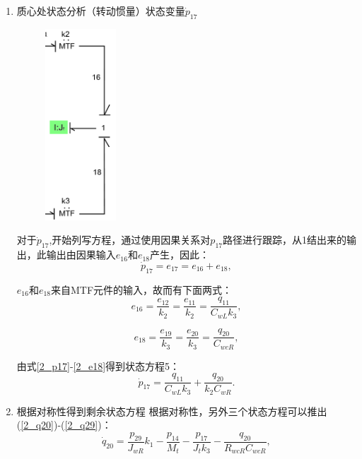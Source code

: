 \begin{enumerate}
\item {质心处状态分析（转动惯量）状态变量$\dot{ p}_{17}$}
\begin{figure}[h]
	\centering
	\includegraphics[width=0.25\textwidth]{fig/2_equation5.png}
\end{figure}
对于$\dot{p} _ { 17 }$,开始列写方程，通过使用因果关系对$p_{17}$路径进行跟踪，从1结出来的输出，此输出由因果输入$e _ { 16 }$和$  e _ { 18 }$产生，因此：
\begin{equation}\label{2_p17}
\dot{p}_{17}
=
e_{17}
=
e_{16}
+
e_{18},
\end{equation}

$e _ { 16 }$和$e_{18}$来自MTF元件的输入，故而有下面两式：
\begin{equation}\label{2_e16}
e_{16}
=
\frac{e_{12}}{k_2}
=
\frac{e_{11}}{k_2}
=
\frac{q_{11}}{C_{w L} k_{3}},
\end{equation}

\begin{equation}\label{2_e18}
e_{18}
=
\frac{e_{19}}{k_3}
=
\frac{e_{20}}{k_3}
=
\frac{q_{20}}{C_{wc R}},
\end{equation}

由式\ref{2_p17}-\ref{2_e18}得到状态方程5：
\begin{equation}
\dot{p}_{17}
=
\frac{q_{11}}{C_{w L} k_{3}}
+
\frac{q_{20}}{k_{2} C_{w R}}.
\end{equation}

\item {根据对称性得到剩余状态方程}
根据对称性，另外三个状态方程可以推出(\ref{2_q20})-(\ref{2_q29})：
\begin{equation}\label{2_q20}
\dot{q}_{20}
=
\frac{p_{29}}{J_{w R}} k_{1}
-
\frac{p_{14}}{M_{t}}
-
\frac{p_{17}}{J_{t} k_{3}}
-
\frac{q_{20}}{R_{wc R} C_{wc R} },
\end{equation}


\end{enumerate}
